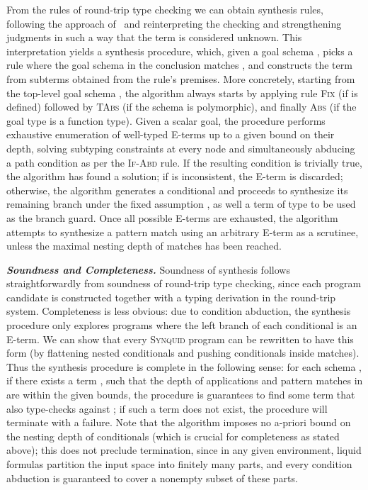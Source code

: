 \documentclass[10pt,preprint]{sigplanconf-pldi16}
\theoremstyle{definition}
\newcommand{\custompar}[1]{\parskip 0pt \textbf{\textit{#1}}}
\newcommand{\lang}{\textsc{Synquid}\xspace}
\begin{document}
From the rules of round-trip type checking we can obtain synthesis rules, following the approach of~\cite{OseraZd15}
and reinterpreting the checking and strengthening judgments
in such a way that the term  is considered unknown.
This interpretation yields a synthesis procedure,
which, given a goal schema , picks a rule where the goal schema in the conclusion matches ,
and constructs the term  from subterms obtained from the rule's premises.
More concretely, starting from the top-level goal schema ,
the algorithm always starts by applying rule \textsc{Fix} (if  is defined)
followed by \textsc{TAbs} (if the schema is polymorphic),
and finally \textsc{Abs} (if the goal type is a function type).
Given a scalar goal,
the procedure performs exhaustive enumeration of well-typed E-terms up to a given bound on their depth,
solving subtyping constraints at every node and
simultaneously abducing a path condition as per the \textsc{If-Abd} rule.
If the resulting condition  is trivially true, the algorithm has found a solution;
if  is inconsistent, the E-term is discarded;
otherwise, the algorithm generates a conditional 
and proceeds to synthesize its remaining branch under the fixed assumption ,
as well a term of type  to be used as the branch guard.
Once all possible E-terms are exhausted,
the algorithm attempts to synthesize a pattern match using an arbitrary E-term as a scrutinee,
unless the maximal nesting depth of matches has been reached.

\custompar{Soundness and Completeness.}
Soundness of synthesis follows straightforwardly from soundness of round-trip type checking, 
since each program candidate is constructed together with a typing derivation in the round-trip system.
Completeness is less obvious:
due to condition abduction, the synthesis procedure only explores programs
where the left branch of each conditional is an E-term.
We can show that every \lang program can be rewritten to have this form
(by flattening nested conditionals and pushing conditionals inside matches).
Thus the synthesis procedure is complete in the following sense: 
for each schema , if there exists a term ,
such that the depth of applications and pattern matches in  are within the given bounds,
the procedure is guarantees to find some term  that also type-checks against ;
if such a term  does not exist, the procedure will terminate with a failure.
Note that the algorithm imposes no a-priori bound on the nesting depth of conditionals
(which is crucial for completeness as stated above);
this does not preclude termination,
since in any given environment, liquid formulas partition the input space into finitely many parts,
and every condition abduction is guaranteed to cover a nonempty subset of these parts.
\end{document}
